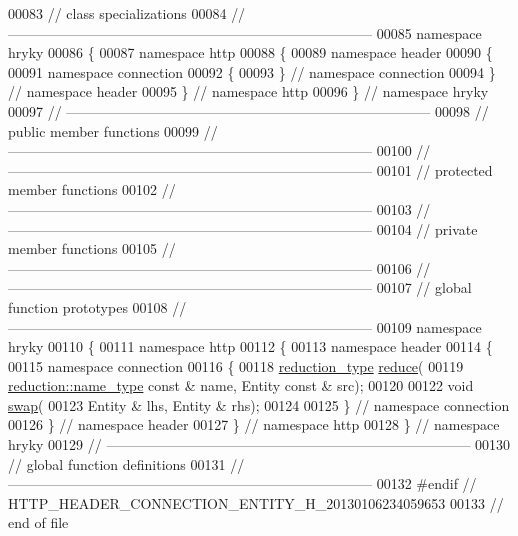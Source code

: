 \begin{DoxyCode}
00083 \textcolor{comment}{// class specializations}
00084 \textcolor{comment}{//
      ------------------------------------------------------------------------------}
00085 \textcolor{keyword}{namespace }hryky
00086 \{
00087 \textcolor{keyword}{namespace }http
00088 \{
00089 \textcolor{keyword}{namespace }header
00090 \{
00091 \textcolor{keyword}{namespace }connection
00092 \{
00093 \} \textcolor{comment}{// namespace connection}
00094 \} \textcolor{comment}{// namespace header}
00095 \} \textcolor{comment}{// namespace http}
00096 \} \textcolor{comment}{// namespace hryky}
00097 \textcolor{comment}{//
      ------------------------------------------------------------------------------}
00098 \textcolor{comment}{// public member functions}
00099 \textcolor{comment}{//
      ------------------------------------------------------------------------------}
00100 \textcolor{comment}{//
      ------------------------------------------------------------------------------}
00101 \textcolor{comment}{// protected member functions}
00102 \textcolor{comment}{//
      ------------------------------------------------------------------------------}
00103 \textcolor{comment}{//
      ------------------------------------------------------------------------------}
00104 \textcolor{comment}{// private member functions}
00105 \textcolor{comment}{//
      ------------------------------------------------------------------------------}
00106 \textcolor{comment}{//
      ------------------------------------------------------------------------------}
00107 \textcolor{comment}{// global function prototypes}
00108 \textcolor{comment}{//
      ------------------------------------------------------------------------------}
00109 \textcolor{keyword}{namespace }hryky
00110 \{
00111 \textcolor{keyword}{namespace }http
00112 \{
00113 \textcolor{keyword}{namespace }header
00114 \{
00115 \textcolor{keyword}{namespace }connection
00116 \{
00118     \hyperlink{namespacehryky_a343a9a4c36a586be5c2693156200eadc}{reduction_type} \hyperlink{namespacehryky_1_1http_a08fc36a78a8e2908140fcd102829a566}{reduce}(
00119         \hyperlink{namespacehryky_1_1reduction_ac686c30a4c8d196bbd0f05629a6b921f}{reduction::name_type} \textcolor{keyword}{const} & name, Entity \textcolor{keyword}{const} & src);
00120 
00122     \textcolor{keywordtype}{void} \hyperlink{namespacehryky_1_1http_a38e62595ad532d18fbc65ceb61973aec}{swap}(
00123         Entity & lhs, Entity & rhs);
00124 
00125 \} \textcolor{comment}{// namespace connection}
00126 \} \textcolor{comment}{// namespace header}
00127 \} \textcolor{comment}{// namespace http}
00128 \} \textcolor{comment}{// namespace hryky}
00129 \textcolor{comment}{//
      ------------------------------------------------------------------------------}
00130 \textcolor{comment}{// global function definitions}
00131 \textcolor{comment}{//
      ------------------------------------------------------------------------------}
00132 \textcolor{preprocessor}{#endif // HTTP\_HEADER\_CONNECTION\_ENTITY\_H\_20130106234059653}
00133 \textcolor{preprocessor}{}\textcolor{comment}{// end of file}
\end{DoxyCode}
